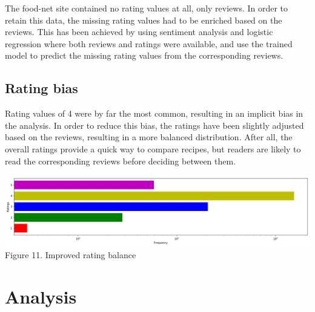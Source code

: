 \documentclass[11pt]{article}
\begin{document}
The food-net site contained no rating values at all, only reviews. In order to retain this data, the missing rating values had to be enriched based on the reviews. This has been achieved by using sentiment analysis and logistic regression where both reviews and ratings were available, and use the trained model to predict the missing rating values from the corresponding reviews.

\subsection{Rating bias}

Rating values of 4 were by far the most common, resulting in an implicit bias in the analysis. In order to reduce this bias, the ratings have been slightly adjusted based on the reviews, resulting in a more balanced distribution. After all, the overall ratings provide a quick way to compare recipes, but readers are likely to read the corresponding reviews before deciding between them.

\vspace{5mm}
\begin{center}
\includegraphics[scale=0.18]{rating-balanced}
\label{visalization-cookingtime} Figure 11. Improved rating balance
\end{center}
\vspace{5mm}

\section{Analysis}
\end{document}
